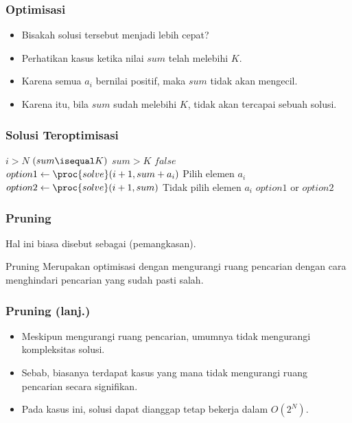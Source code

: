 \begin{frame}
\frametitle{Optimisasi}
\begin{itemize}
  \item Bisakah solusi tersebut menjadi lebih cepat?
  \item Perhatikan kasus ketika nilai $sum$ telah melebihi $K$.
  \item Karena semua $a_i$ bernilai positif, maka $sum$ tidak akan mengecil.
  \item Karena itu, bila $sum$ sudah melebihi $K$,  tidak akan tercapai sebuah solusi.
\end{itemize}
\end{frame}

\begin{frame}
\frametitle{Solusi Teroptimisasi}
\begin{codebox}
\li \If $i > N$ \Then
\li   \Return $(sum \isequal K)$
    \End
\zi
\li \If $sum > K$ \Then
\li   \Return $false$
    \End
\zi
\li $option1 \gets \proc{solve}(i+1, sum + a_i)$ \Comment Pilih elemen $a_i$
\li $option2 \gets \proc{solve}(i+1, sum)$ \Comment Tidak pilih elemen $a_i$
\li \Return $option1$ or $option2$
\end{codebox}
\end{frame}

\begin{frame}
\frametitle{Pruning}
Hal ini biasa disebut sebagai  (pemangkasan).
\begin{block}{Pruning}
  Merupakan optimisasi dengan mengurangi ruang pencarian dengan cara menghindari pencarian yang sudah pasti salah.
\end{block}
\end{frame}

\begin{frame}
\frametitle{Pruning (lanj.)}
\begin{itemize}
  \item Meskipun mengurangi ruang pencarian, \fpruning umumnya tidak mengurangi kompleksitas solusi.
  \item Sebab, biasanya terdapat kasus yang mana \fpruning tidak mengurangi ruang pencarian secara signifikan.
  \item Pada kasus ini, solusi dapat dianggap tetap bekerja dalam $O(2^N)$.
\end{itemize}
\end{frame}

